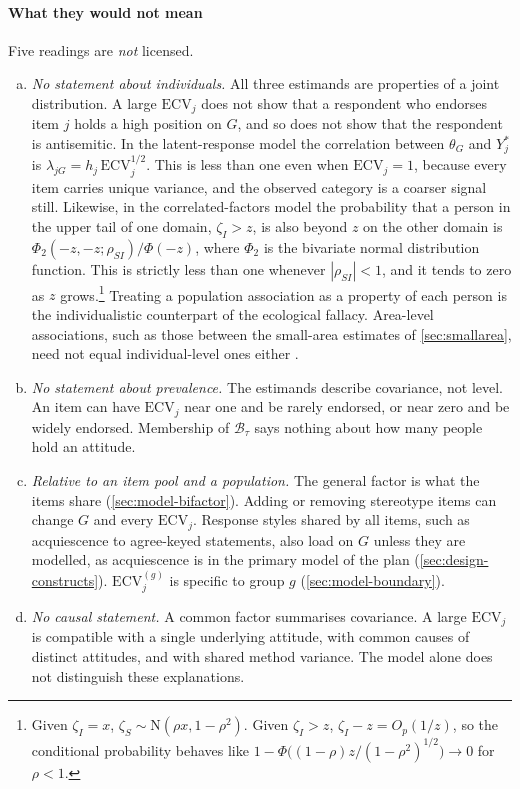 \paragraph{What they would not mean}
Five readings are \emph{not} licensed.
\begin{enumerate}[(a)]
  \item \emph{No statement about individuals.} All three estimands are properties of a joint distribution. A large $\mathrm{ECV}_j$ does not show that a respondent who endorses item $j$ holds a high position on $G$, and so does not show that the respondent is antisemitic. In the latent-response model the correlation between $\theta_G$ and $Y^*_j$ is $\lambda_{jG}=h_j\,\mathrm{ECV}_j^{1/2}$. This is less than one even when $\mathrm{ECV}_j=1$, because every item carries unique variance, and the observed category is a coarser signal still. Likewise, in the correlated-factors model the probability that a person in the upper tail of one domain, $\zeta_I>z$, is also beyond $z$ on the other domain is $\Phi_2(-z,-z;\rho_{SI})/\Phi(-z)$, where $\Phi_2$ is the bivariate normal distribution function. This is strictly less than one whenever $|\rho_{SI}|<1$, and it tends to zero as $z$ grows.\footnote{Given $\zeta_I=x$, $\zeta_S\sim\mathrm N(\rho x,1-\rho^2)$. Given $\zeta_I>z$, $\zeta_I-z=O_p(1/z)$, so the conditional probability behaves like $1-\Phi\bigl((1-\rho)z/(1-\rho^2)^{1/2}\bigr)\to0$ for $\rho<1$.} Treating a population association as a property of each person is the individualistic counterpart of the ecological fallacy. Area-level associations, such as those between the small-area estimates of \cref{sec:smallarea}, need not equal individual-level ones either \citep{robinson1950}.
  \item \emph{No statement about prevalence.} The estimands describe covariance, not level. An item can have $\mathrm{ECV}_j$ near one and be rarely endorsed, or near zero and be widely endorsed. Membership of $\mathcal B_\tau$ says nothing about how many people hold an attitude.
  \item \emph{Relative to an item pool and a population.} The general factor is what the items share (\cref{sec:model-bifactor}). Adding or removing stereotype items can change $G$ and every $\mathrm{ECV}_j$. Response styles shared by all items, such as acquiescence to agree-keyed statements, also load on $G$ unless they are modelled, as acquiescence is in the primary model of the plan (\cref{sec:design-constructs}). $\mathrm{ECV}^{(g)}_j$ is specific to group $g$ (\cref{sec:model-boundary}).
  \item \emph{No causal statement.} A common factor summarises covariance. A large $\mathrm{ECV}_j$ is compatible with a single underlying attitude, with common causes of distinct attitudes, and with shared method variance. The model alone does not distinguish these explanations.

\end{enumerate}
